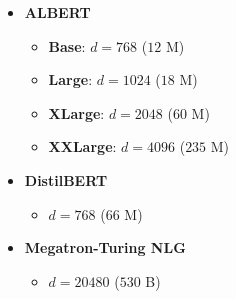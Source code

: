 \begin{slide}[\slideopts,toc={Model Dimension}]
\begin{multicols}{2}
\begin{itemize}
    
    \item \textbf{ALBERT}
    \begin{itemize}
        \item \textbf{Base}: $d = 768$ ($12$ M)
        \item \textbf{Large}: $d = 1024$ ($18$ M)
        \item \textbf{XLarge}: $d = 2048$ ($60$ M)
        \item \textbf{XXLarge}: $d = 4096$ ($235$ M)
    \end{itemize}
    
    \item \textbf{DistilBERT}
    \begin{itemize}
        \item $d = 768$ ($66$ M)
    \end{itemize}
    
    \item \textbf{Megatron-Turing NLG}
    \begin{itemize}
        \item $d = 20480$ ($530$ B)
    \end{itemize}
    
\end{itemize}

\end{multicols}





\end{slide}
